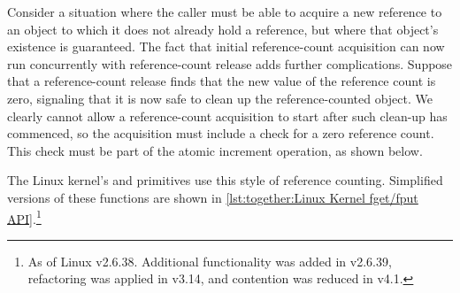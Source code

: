 Consider a situation where the caller must be able to acquire a new
reference to an object to which it does not already hold a reference,
but where that object's existence is guaranteed.
The fact that initial reference-count acquisition can now run concurrently
with reference-count release adds further complications.
Suppose that a reference-count release finds that the new
value of the reference count is zero, signaling that it is
now safe to clean up the reference-counted object.
We clearly cannot allow a reference-count acquisition to
start after such clean-up has commenced, so the acquisition
must include a check for a zero reference count.
This check must be part of the atomic increment operation,
as shown below.

\QuickQuizEnd

The Linux kernel's  and  primitives
use this style of reference counting.
Simplified versions of these functions are shown in
\cref{lst:together:Linux Kernel fget/fput API}.\footnote{
	As of Linux v2.6.38.
	Additional  functionality was added in v2.6.39,
	refactoring was applied in v3.14, and  contention
	was reduced in v4.1.}

